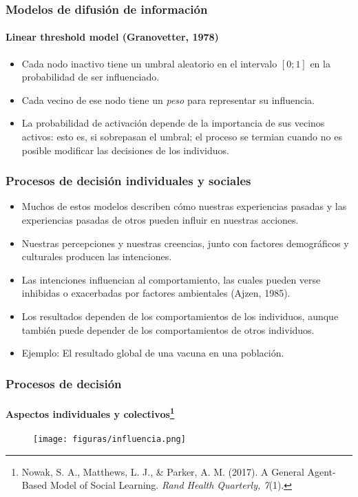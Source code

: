 \documentclass[11pt]{beamer}
\begin{document}
\begin{frame}
	\frametitle{Modelos de difusión de información}
	\framesubtitle{Linear threshold model (Granovetter, 1978)}
		\begin{itemize}
	\item Cada nodo inactivo tiene un umbral aleatorio en el intervalo $[0 ; 1]$ en la probabilidad de ser influenciado.
	\item Cada vecino de ese nodo tiene un \textit{peso} para representar su influencia.
	\item La probabilidad de activación depende de la importancia de sus vecinos activos: esto es, si sobrepasan el umbral; el proceso se termian cuando no es posible modificar las decisiones de los individuos.
\end{itemize}
\end{frame}


\begin{frame}
	\frametitle{Procesos de decisión individuales y sociales}
	\begin{itemize}
		\item Muchos de estos modelos describen cómo nuestras experiencias pasadas y las experiencias pasadas de otros pueden influir en nuestras acciones.
		\item Nuestras percepciones y nuestras creencias, junto con factores demográficos y culturales producen las intenciones.
		\item Las intenciones influencian al comportamiento, las cuales pueden verse inhibidas o exacerbadas por factores ambientales (Ajzen, 1985).
		\item Los resultados dependen de los comportamientos de los individuos, aunque también puede depender de los comportamientos de otros individuos. 
		\item Ejemplo: El resultado global de una vacuna en una población.
	\end{itemize}
\end{frame}

\begin{frame}
	\frametitle{Procesos de decisión}
	\framesubtitle{Aspectos individuales y colectivos\footnote{{\scriptsize Nowak, S. A., Matthews, L. J., \& Parker, A. M. (2017). A General Agent-Based Model of Social Learning. \textit{Rand Health Quarterly, 7}(1).}}}
	\begin{figure}
		\centering
		\texttt{[image: figuras/influencia.png]}
		\label{fig:influencia}
	\end{figure}
	
\end{frame}
\end{document}
